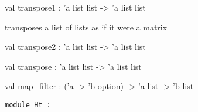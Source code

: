 \documentclass[11pt]{article}
\begin{document}
\begin{ocamldocsigend}
\label{val:Util.L.transpose1}\begin{ocamldoccode}
val transpose1 : 'a list list -> 'a list list
\end{ocamldoccode}
\begin{ocamldocdescription}
transposes a list of lists as if it were a matrix


\end{ocamldocdescription}


\label{val:Util.L.transpose2}\begin{ocamldoccode}
val transpose2 : 'a list list -> 'a list list
\end{ocamldoccode}


\label{val:Util.L.transpose}\begin{ocamldoccode}
val transpose : 'a list list -> 'a list list
\end{ocamldoccode}


\label{val:Util.L.map-underscorefilter}\begin{ocamldoccode}
val map_filter : ('a -> 'b option) -> 'a list -> 'b list
\end{ocamldoccode}
\end{ocamldocsigend}






\begin{ocamldoccode}
{\tt{module }}{\tt{Ht}}{\tt{ : }}\end{ocamldoccode}
\label{module:Util.Ht}
\end{document}
